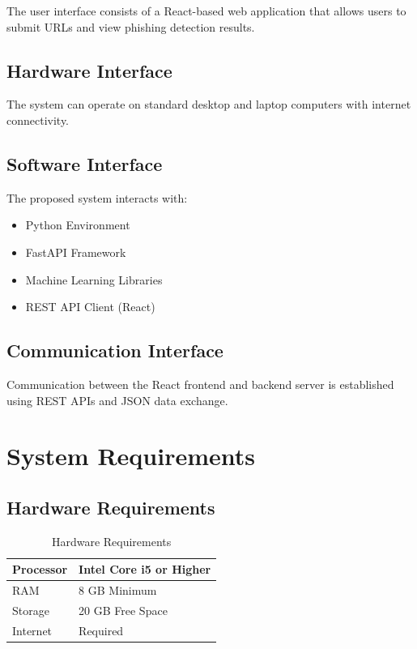 \documentclass[12pt]{report}
\begin{document}
The user interface consists of a React-based web application that allows users to submit URLs and view phishing detection results.

\subsection{Hardware Interface}

The system can operate on standard desktop and laptop computers with internet connectivity.

\subsection{Software Interface}

The proposed system interacts with:

\begin{itemize}
    \item Python Environment
    \item FastAPI Framework
    \item Machine Learning Libraries
    \item REST API Client (React)
\end{itemize}

\subsection{Communication Interface}

Communication between the React frontend and backend server is established using REST APIs and JSON data exchange.

\section{System Requirements}

\subsection{Hardware Requirements}

\begin{table}[H]
\centering
\caption{Hardware Requirements}
\begin{tabular}{|l|l|}
\hline
Processor & Intel Core i5 or Higher \\
\hline
RAM & 8 GB Minimum \\
\hline
Storage & 20 GB Free Space \\
\hline
Internet & Required \\
\hline
\end{tabular}
\end{table}
\end{document}
